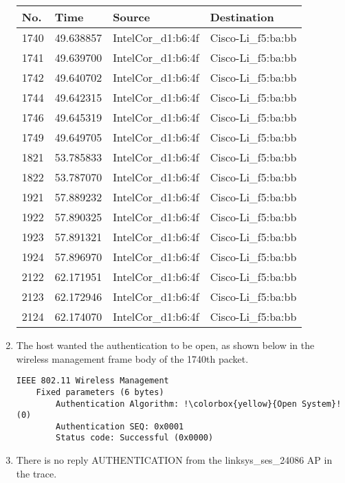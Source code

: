\documentclass{article}
\begin{document}
\begin{enumerate}
    \begin{tabular}{@{}llll@{}}
        \toprule
        No. & Time & Source & Destination \\ \midrule
        1740 & 49.638857 & IntelCor\_d1:b6:4f & Cisco-Li\_f5:ba:bb \\
        1741 & 49.639700 & IntelCor\_d1:b6:4f & Cisco-Li\_f5:ba:bb \\
        1742 & 49.640702 & IntelCor\_d1:b6:4f & Cisco-Li\_f5:ba:bb \\
        1744 & 49.642315 & IntelCor\_d1:b6:4f & Cisco-Li\_f5:ba:bb \\
        1746 & 49.645319 & IntelCor\_d1:b6:4f & Cisco-Li\_f5:ba:bb \\
        1749 & 49.649705 & IntelCor\_d1:b6:4f & Cisco-Li\_f5:ba:bb \\
        1821 & 53.785833 & IntelCor\_d1:b6:4f & Cisco-Li\_f5:ba:bb \\
        1822 & 53.787070 & IntelCor\_d1:b6:4f & Cisco-Li\_f5:ba:bb \\
        1921 & 57.889232 & IntelCor\_d1:b6:4f & Cisco-Li\_f5:ba:bb \\
        1922 & 57.890325 & IntelCor\_d1:b6:4f & Cisco-Li\_f5:ba:bb \\
        1923 & 57.891321 & IntelCor\_d1:b6:4f & Cisco-Li\_f5:ba:bb \\
        1924 & 57.896970 & IntelCor\_d1:b6:4f & Cisco-Li\_f5:ba:bb \\
        2122 & 62.171951 & IntelCor\_d1:b6:4f & Cisco-Li\_f5:ba:bb \\
        2123 & 62.172946 & IntelCor\_d1:b6:4f & Cisco-Li\_f5:ba:bb \\
        2124 & 62.174070 & IntelCor\_d1:b6:4f & Cisco-Li\_f5:ba:bb \\ \bottomrule
    \end{tabular}
        
    \item The host wanted the authentication to be open, as shown below in the wireless management frame body of the 1740th packet.
\begin{verbatim}
IEEE 802.11 Wireless Management
    Fixed parameters (6 bytes)
        Authentication Algorithm: !\colorbox{yellow}{Open System}! (0)
        Authentication SEQ: 0x0001
        Status code: Successful (0x0000)
\end{verbatim}

    \item There is no reply AUTHENTICATION from the linksys\_ses\_24086 AP in the trace.
    

\end{enumerate}
\end{document}
